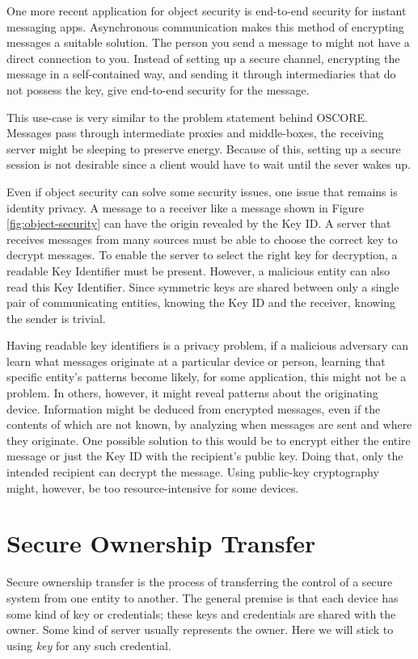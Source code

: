 One more recent application for object security is end-to-end security for instant messaging apps. Asynchronous communication makes this method of encrypting messages a suitable solution. The person you send a message to might not have a direct connection to you. Instead of setting up a secure channel, encrypting the message in a self-contained way, and sending it through intermediaries that do not possess the key, give end-to-end security for the message. 

This use-case is very similar to the problem statement behind OSCORE. Messages pass through intermediate proxies and middle-boxes, the receiving server might be sleeping to preserve energy. Because of this, setting up a secure session is not desirable since a client would have to wait until the sever wakes up.  

Even if object security can solve some security issues, one issue that remains is identity privacy. A message to a receiver like a message shown in Figure \ref{fig:object-security} can have the origin revealed by the Key ID. A server that receives messages from many sources must be able to choose the correct key to decrypt messages. To enable the server to select the right key for decryption, a readable Key Identifier must be present. However, a malicious entity can also read this Key Identifier. Since symmetric keys are shared between only a single pair of communicating entities, knowing the Key ID and the receiver, knowing the sender is trivial. 

Having readable key identifiers is a privacy problem, if a malicious adversary can learn what messages originate at a particular device or person, learning that specific entity's patterns become likely, for some application, this might not be a problem. In others, however, it might reveal patterns about the originating device. Information might be deduced from encrypted messages, even if the contents of which are not known, by analyzing when messages are sent and where they originate. One possible solution to this would be to encrypt either the entire message or just the Key ID with the recipient's public key. Doing that, only the intended recipient can decrypt the message. Using public-key cryptography might, however, be too resource-intensive for some devices.

\section{Secure Ownership Transfer}
\label{sec:ot}
Secure ownership transfer is the process of transferring the control of a secure system from one entity to another. The general premise is that each device has some kind of key or credentials; these keys and credentials are shared with the owner. Some kind of server usually represents the owner. Here we will stick to using \emph{key} for any such credential.

